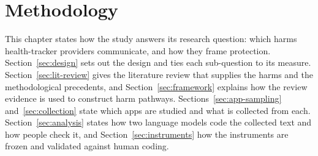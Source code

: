 \chapter{Methodology}
\label{ch:methodology}

This chapter states how the study answers its research question: which harms health-tracker
providers communicate, and how they frame protection. Section~\ref{sec:design} sets out the
design and ties each sub-question to its measure. Section~\ref{sec:lit-review} gives the
literature review that supplies the harms and the methodological precedents, and
Section~\ref{sec:framework} explains how the review evidence is used to construct harm
pathways. Sections~\ref{sec:app-sampling} and~\ref{sec:collection} state which apps are studied
and what is collected from each. Section~\ref{sec:analysis} states how two language models code
the collected text and how people check it, and Section~\ref{sec:instruments} how the
instruments are frozen and validated against human coding.

